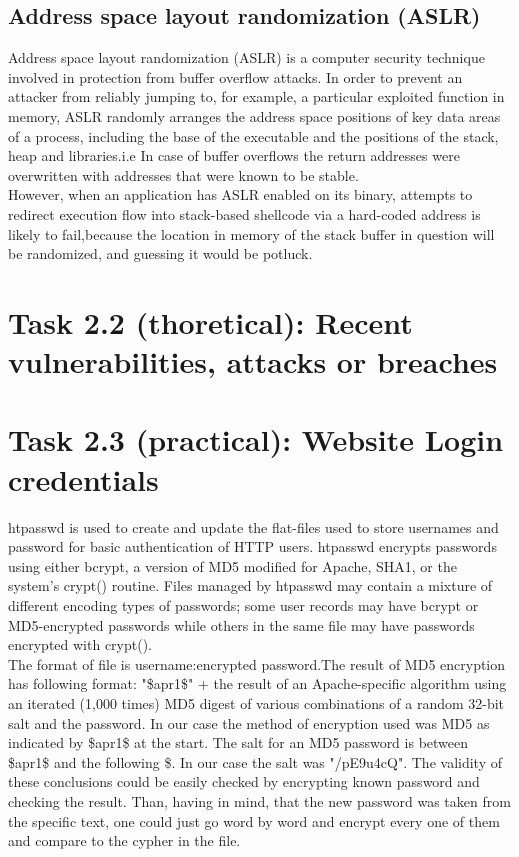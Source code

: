 \documentclass{article}
\begin{document}
\subsection*{Address space layout randomization (ASLR)}
Address space layout randomization (ASLR) is a computer security technique involved in protection from buffer overflow attacks. In order to prevent an attacker from reliably jumping to, for example, a particular exploited function in memory, ASLR randomly arranges the address space positions of key data areas of a process, including the base of the executable and the positions of the stack, heap and libraries.i.e In case of buffer overflows the return addresses were overwritten with addresses that were known to be stable.
\\
However, when an application has ASLR enabled on its binary, attempts to redirect execution flow
into stack-based shellcode via a hard-coded address is likely to fail,because the location in 
memory of the stack buffer in question will be randomized, and guessing it would be potluck.

\section*{Task 2.2 (thoretical): Recent vulnerabilities, attacks or breaches }


\section*{Task 2.3 (practical): Website Login credentials}
htpasswd is used to create and update the flat-files used to store usernames and password for basic authentication of HTTP users. htpasswd encrypts passwords using either bcrypt, a version of MD5 modified for Apache, SHA1, or the system's crypt() routine. Files managed by htpasswd may contain a mixture of different encoding types of passwords; some user records may have bcrypt or MD5-encrypted passwords while others in the same file may have passwords encrypted with crypt().
\\
The format of file is username:encrypted password.The result of MD5 encryption has following format:
"{\$}apr1{\$}" + the result of an Apache-specific algorithm using an iterated (1,000 times) MD5 digest of various combinations of a random 32-bit salt and the password. In our case the method of encryption used was MD5 as indicated by {\$}apr1{\$} at the start. The salt for an MD5 password is between {\$}apr1{\$} and the following {\$}. In our case the salt was "/pE9u4cQ". The validity of these conclusions could be easily checked by encrypting known password and checking the result. Than, having in mind, that the new password was taken from the specific text, one could just go word by word and encrypt every one of them and compare to the cypher in the file.
\end{document}

